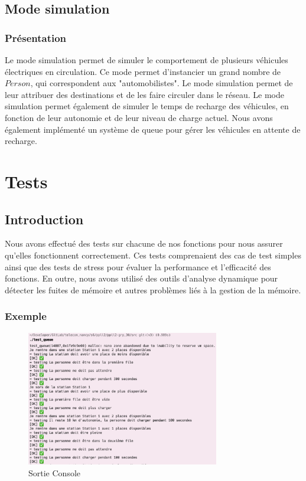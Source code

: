 \documentclass[french,a4paper]{article}
\begin{document}
\subsection{Mode simulation}
\subsubsection{Présentation}
Le mode simulation permet de simuler le comportement de plusieurs véhicules électriques en circulation. Ce mode permet d'instancier un grand nombre de $Person$, qui correspondent aux "automobilistes". Le mode simulation permet de leur attribuer des destinations et de les faire circuler dans le réseau. Le mode simulation permet également de simuler le temps de recharge des véhicules, en fonction de leur autonomie et de leur niveau de charge actuel. Nous avons également implémenté un système de queue pour gérer les véhicules en attente de recharge.


\section{Tests}

\subsection{Introduction}
Nous avons effectué des tests sur chacune de nos fonctions pour nous assurer qu'elles fonctionnent correctement. Ces tests comprenaient des cas de test simples ainsi que des tests de stress pour évaluer la performance et l'efficacité des fonctions. En outre, nous avons utilisé des outils d'analyse dynamique pour détecter les fuites de mémoire et autres problèmes liés à la gestion de la mémoire.

\subsubsection{Exemple}

\begin{center}
    \begin{figure}[H]
        \centering
        \includegraphics[width=0.75\textwidth]{img/TEST.png}
        \caption{Sortie Console}
    \end{figure}
\end{center}
\end{document}
